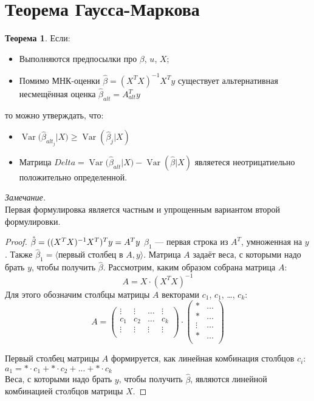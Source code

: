 \documentclass[12pt]{article} %
\theoremstyle{definition} %
\newtheorem{theorem}{Теорема}[section]
\DeclareMathOperator{\Var}{Var}
\begin{document}
\section{Теорема Гаусса-Маркова}

\begin{theorem}
Если:
\begin{itemize}
    \item Выполняются предпосылки про $\beta$, $u$, $X$;
    \item Помимо МНК-оценки $\hat{\beta}=(X^TX)^{-1}X^Ty$ существует альтернативная несмещённая оценка $\hat{\beta}_{alt}=A_{alt}^Ty$
\end{itemize}
то можно утверждать, что:
\begin{itemize}
    \item $\Var({\hat{\beta}_{alt_j}|X)} \geq{\Var(\hat{\beta}_j|X)}$
    \item Матрица $Delta = \Var({\hat{\beta}_{alt}|X)}-\Var(\hat{\beta}|X)$ являетеся неотрицатиельно положительно определенной.
\end{itemize}
\textit{Замечание.}\\
Первая формулировка является частным и упрощенным вариантом второй формулировки.
\begin{proof}
$\hat{\beta}=((X^TX)^{-1}X^T)^Ty=A^Ty\\$
$\hat{\beta}_1$ — первая строка из $A^T$, умноженная на $y$.
Также $\hat{\beta}_1 = \langle \text{первый столбец в } A,  y\rangle$.
Матрица $A$ задаёт веса, с которыми надо брать $y$, чтобы получить $\hat{\beta}$.
Рассмотрим, каким образом собрана матрица $A$:
\[
A=X\cdot(X^TX)^{-1}
\]
Для этого обозначим столбцы матрицы $A$ векторами $c_1$, $c_1$, \ldots, $c_k$:
\[A=
\begin{pmatrix}
\vdots & \vdots & \dots & \vdots \\
c_1 & c_2 & \dots & c_k\\
\vdots & \vdots & \vdots &\vdots\\
\end{pmatrix}
\cdot
\begin{pmatrix}
* & \dots \\
* & \dots \\
\vdots &\dots\\
* & \dots \\
\end{pmatrix}
\]

Первый столбец матрицы $A$ формируется, как линейная комбинация столбцов $c_i$: \\
$a_1=* \cdot c_1+* \cdot c_2+...+ * \cdot c_k$
\\
Веса, с которыми надо брать $y$, чтобы получить $\hat{\beta}$, являются линейной комбинацией столбцов матрицы $X$.


\end{proof}
\end{theorem}
\end{document}
